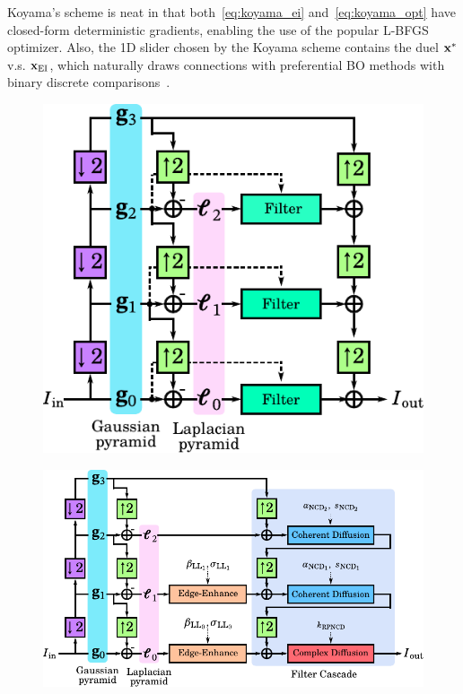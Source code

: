 Koyama's scheme is neat in that both~\cref{eq:koyama_ei} and~\cref{eq:koyama_opt} have closed-form deterministic gradients, enabling the use of the popular L-BFGS~\cite{liu_limited_1989} optimizer.
Also, the 1D slider chosen by the Koyama scheme contains the duel \(\mathbf{x}^*\) v.s. \(\mathbf{x}_{\mathrm{EI}}\), which naturally draws connections with preferential BO methods with binary discrete comparisons~\cite{NIPS2007_b6a1085a}.


\begin{figure}
  \hspace{-0.3in}
  \centering
  \begin{minipage}[c]{0.43\textwidth}
    \centering
    \includegraphics[scale=0.7]{figures/conventional_laplacian_pyramid.pdf}
    \label{fig:lpnd}
  \end{minipage}
  \begin{minipage}[c]{0.53\textwidth}
    \centering
    \includegraphics[scale=0.7]{figures/multiscale_filter.pdf}

\end{minipage}
\end{figure}
